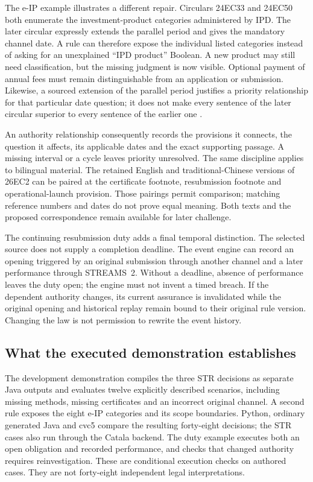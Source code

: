 \documentclass[12pt,a4paper,oneside,openany]{book}
\begin{document}
The e-IP example illustrates a different repair. Circulars 24EC33 and 24EC50
both enumerate the investment-product categories administered by IPD. The later
circular expressly extends the parallel period and gives the mandatory channel
date. A rule can therefore expose the individual listed categories instead of
asking for an unexplained ``IPD product'' Boolean. A new product may still need
classification, but the missing judgment is now visible. Optional payment of
annual fees must remain distinguishable from an application or submission.
Likewise, a sourced extension of the parallel period justifies a priority
relationship for that particular date question; it does not make every sentence
of the later circular superior to every sentence of the earlier one
\citep{sfceiplaunch2024,sfceipadoption2024}.

An authority relationship consequently records the provisions it connects, the
question it affects, its applicable dates and the exact supporting passage.
A missing interval or a cycle leaves priority unresolved. The same discipline
applies to bilingual material. The retained English and traditional-Chinese
versions of 26EC2 can be paired at the certificate footnote, resubmission
footnote and operational-launch provision. Those pairings permit comparison;
matching reference numbers and dates do not prove equal meaning. Both texts and
the proposed correspondence remain available for later challenge.

The continuing resubmission duty adds a final temporal distinction. The selected
source does not supply a completion deadline. The event engine can record an
opening triggered by an original submission through another channel and a later
performance through STREAMS~2. Without a deadline, absence of performance leaves
the duty open; the engine must not invent a timed breach. If the dependent
authority changes, its current assurance is invalidated while the original
opening and historical replay remain bound to their original rule version.
Changing the law is not permission to rewrite the event history.

\subsection{What the executed demonstration establishes}

The development demonstration compiles the three STR decisions as separate
Java outputs and evaluates twelve explicitly described scenarios, including
missing methods, missing certificates and an incorrect original channel. A
second rule exposes the eight e-IP categories and its scope boundaries. Python,
ordinary generated Java and cvc5 compare the resulting forty-eight decisions;
the STR cases also run through the Catala backend. The duty example executes
both an open obligation and recorded performance, and checks that changed
authority requires reinvestigation. These are conditional execution checks on
authored cases. They are not forty-eight independent legal interpretations.
\end{document}
